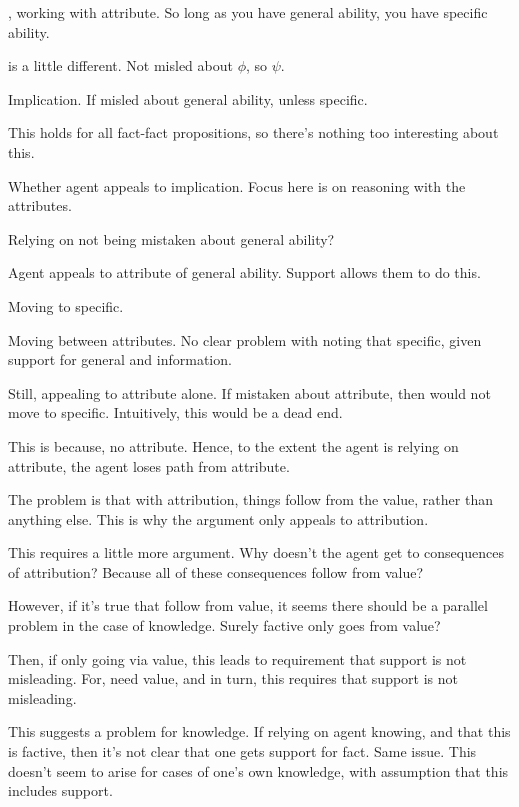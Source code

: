 \begin{note}[Application of \nI{} to \AR{}]
  \AR{}, working with attribute.
  So long as you have general ability, you have specific ability.

  \nI{} is a little different.
  Not misled about \(\phi\), so \(\psi\).

  Implication.
  If misled about general ability, unless specific.

  This holds for all fact-fact propositions, so there's nothing too interesting about this.

  Whether agent appeals to implication.
  Focus here is on reasoning with the attributes.

  Relying on not being mistaken about general ability?

  Agent appeals to attribute of general ability.
  Support allows them to do this.

  Moving to specific.

  Moving between attributes.
  No clear problem with noting that specific, given support for general and information.

  Still, appealing to attribute alone.
  If mistaken about attribute, then would not move to specific.
  Intuitively, this would be a dead end.

  This is because, no attribute.
  Hence, to the extent the agent is relying on attribute, the agent loses path from attribute.

  The problem is that with attribution, things follow from the value, rather than anything else.
  This is why the argument only appeals to attribution.

  This requires a little more argument.
  Why doesn't the agent get to consequences of attribution?
  Because all of these consequences follow from value?

  However, if it's true that follow from value, it seems there should be a parallel problem in the case of knowledge.
  Surely factive only goes from value?

  Then, if only going via value, this leads to requirement that support is not misleading.
  For, need value, and in turn, this requires that support is not misleading.

  {
    This suggests a problem for knowledge.
    If relying on agent knowing, and that this is factive, then it's not clear that one gets support for fact.
    Same issue.
    This doesn't seem to arise for cases of one's own knowledge, with assumption that this includes support.

}
\end{note}
